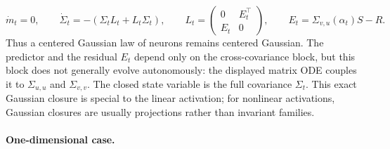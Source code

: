 \begin{example}
	\[
		\dot m_t=0,
		\qquad
		\dot\Sigma_t=-(\Sigma_t L_t+L_t\Sigma_t),
		\qquad
		L_t=
		\begin{pmatrix}
			0 & E_t^\top\\
			E_t & 0
		\end{pmatrix},
		\qquad
		E_t=\Sigma_{v,u}(\alpha_t)S-R.
	\]
	Thus a centered Gaussian law of neurons remains centered Gaussian. The predictor and the residual $E_t$ depend only on the cross-covariance block, but this block does not generally evolve autonomously: the displayed matrix ODE couples it to $\Sigma_{u,u}$ and $\Sigma_{v,v}$. The closed state variable is the full covariance $\Sigma_t$. This exact Gaussian closure is special to the linear activation; for nonlinear activations, Gaussian closures are usually projections rather than invariant families.
\end{example}

\paragraph{One-dimensional case.}

